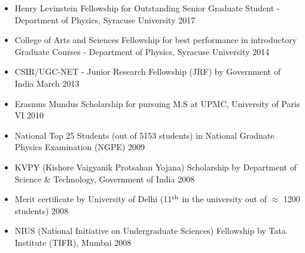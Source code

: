 
 \begin{itemize}
 \item Henry Levinstein Fellowship for Outstanding Senior Graduate Student - Department of Physics, Syracuse University \hfill 2017 
\item  College of Arts and Sciences Fellowship for best performance in introductory Graduate Courses - Department of Physics, Syracuse University \hfill 2014 
 \item CSIR/UGC-NET - Junior Research Fellowship (JRF) by Government of India \hfill March 2013
 \item Erasmus Mundus Scholarship for pursuing M.S at UPMC, University of Paris VI  \hfill \textsc{2010}
 \item National Top 25 Students (out of 5153 students) in National Graduate Physics Examination (NGPE) \hfill \textsc{2009}
  \item KVPY (Kishore Vaigyanik Protsahan Yojana) Scholarship by Department of Science \& Technology, Government of India \hfill 2008
 \item Merit certificate by University of Delhi (11$^{\rm{th}}$ in the university out of $\approx$ 1200 students) \hfill 2008
 \item NIUS (National Initiative on Undergraduate Sciences) Fellowship by Tata Institute (TIFR), Mumbai  \hfill 2008
 \end{itemize} 
